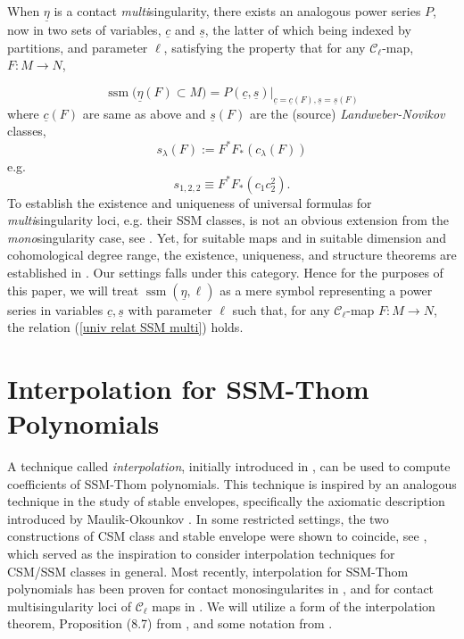 \documentclass[11pt]{article}
\theoremstyle{plain}
\theoremstyle{definition}
\theoremstyle{definition}
\newcounter{equation}
\DeclareMathOperator{\ssm}{ssm}
\begin{document}
When $\underline{\eta}$ is a contact \textit{multi}singularity, there exists an analogous power series $P$, now in two sets of variables, $\underline{c}$ and $\underline{s}$, the latter of which being indexed by partitions, and parameter $\ell$, satisfying the property that for any $\mathcal C_\ell$-map, $F: M \to N$, 

\begin{equation}\label{univ relat SSM multi}
 \ssm\big(\underline{\eta}(F)\subset M\big) = P(\underline{c},\underline{s})\Big|_{\underline{c}=\underline{c}(F),\underline{s}=\underline{s}(F)}
\end{equation}
where $\underline{c}(F)$ are same as above and $\underline{s}(F)$ are the (source) \textit{Landweber-Novikov} classes, 
\[
s_\lambda(F):=F^*F_*(c_\lambda(F))
\]
e.g.
\[
s_{1,2,2} \equiv F^*F_*(c_1c_2^2).
\]
To establish the existence and uniqueness of universal formulas for {\em multi}singularity loci, e.g. their SSM classes, is not an obvious extension from the {\em mono}singularity case, see \cite{Kazarian_2003, Kazarian_2006, ohm24, rimanyi}. Yet, for suitable maps and in suitable dimension and cohomological degree range, the existence, uniqueness, and structure theorems are established in \cite{rimanyi}. Our settings falls under this category. Hence for the purposes of this paper, we will treat $\ssm(\underline{\eta},\ell)$ as a mere symbol representing a power series in variables $\underline{c},\underline{s}$ with parameter $\ell$ such that, for any $\mathcal C_\ell$-map $F: M\to N$, the relation (\ref{univ relat SSM multi}) holds.

\section{Interpolation for SSM-Thom Polynomials}

A technique called \textit{interpolation}, initially introduced in \cite{Rim2001}, can be used to compute coefficients of SSM-Thom polynomials. This technique is inspired by an analogous technique in the study of stable envelopes, specifically the axiomatic description introduced by Maulik-Okounkov \cite{MO}. In some restricted settings, the two constructions of CSM class and stable envelope were shown to coincide, see \cite{FR18, RV18}, which served as the inspiration to consider interpolation techniques for CSM/SSM classes in general. Most recently, interpolation for SSM-Thom polynomials has been proven for contact monosingularites in \cite{rimanyi2025interpolationcharacterizationhigherthom}, and for contact multisingularity loci of $\mathcal C_\ell$ maps in \cite{rimanyi}. We will utilize a form of the interpolation theorem, Proposition (8.7) from \cite{rimanyi}, and some notation from \cite{rimanyi2025interpolationcharacterizationhigherthom}. 
\end{document}
